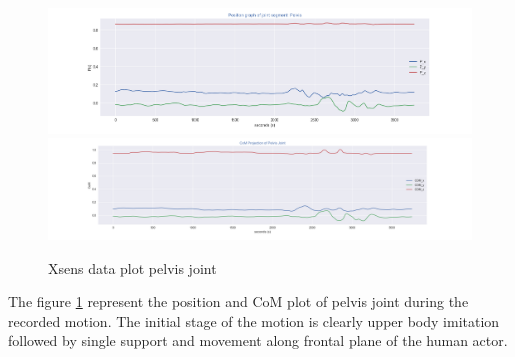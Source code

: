 \begin{figure}[h!]
    \centering
    \includegraphics[scale=0.435]{images/xsens-pelvis-position.png}\hfill
    \includegraphics[scale=0.35]{images/xsens-pelvis-com.png}\hfill
    \caption{Xsens data plot pelvis joint}\hfill
    \label{fig: xsens-plot}
\end{figure}

The figure \ref{fig: xsens-plot} represent the position and CoM plot of pelvis joint during the recorded motion. 
The initial stage of the motion is clearly upper body imitation followed by single support and movement along frontal plane of the human actor.